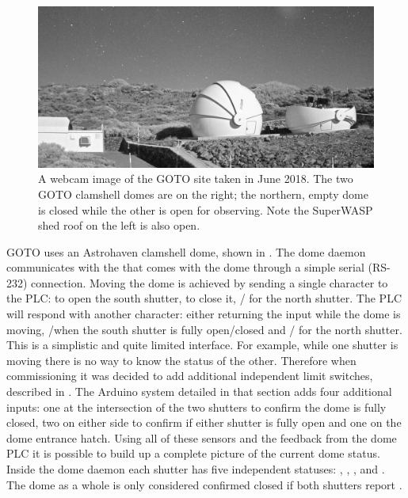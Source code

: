 \begin{colsection}
\begin{colsection}
\begin{figure}[t]
    \begin{center}
        \includegraphics[width=\linewidth]{images/webcam_open.jpeg}
    \end{center}
    \caption[Webcam image of the GOTO site at night]{
        A webcam image of the GOTO site taken in June 2018. The two GOTO clamshell domes are on the right; the northern, empty dome is closed while the other is open for observing. Note the SuperWASP shed roof on the left is also open.
    }\label{fig:webcam}
\end{figure}

GOTO uses an Astrohaven clamshell dome, shown in . The dome daemon communicates with the  that comes with the dome through a simple serial (RS-232) connection. Moving the dome is achieved by sending a single character to the PLC:\@ {} to open the south shutter,  to close it, / for the north shutter. The PLC will respond with another character: either returning the input while the dome is moving, /when the south shutter is fully open/closed and / for the north shutter. This is a simplistic and quite limited interface. For example, while one shutter is moving there is no way to know the status of the other. Therefore when commissioning it was decided to add additional independent limit switches, described in . The Arduino system detailed in that section adds four additional inputs: one at the intersection of the two shutters to confirm the dome is fully closed, two on either side to confirm if either shutter is fully open and one on the dome entrance hatch. Using all of these sensors and the feedback from the dome PLC it is possible to build up a complete picture of the current dome status. Inside the dome daemon each shutter has five independent statuses: , , ,  and . The dome as a whole is only considered confirmed closed if both shutters report .


\end{colsection}
\end{colsection}
